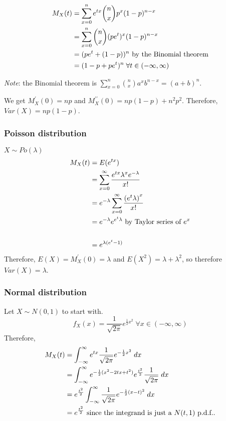\documentclass[12pt]{article}
\begin{document}
\begin{align*}
   M_X (t) &= \sum_{x=0}^{n} e^{tx} {n \choose x} p^x(1-p)^{n-x} \\	
   &= \sum_{x=0}^{n} {n \choose x} (pe^t)^x(1-p)^{n-x} \\
   &= (pe^t + (1 - p))^n \textnormal{ by the Binomial theorem} \\	
   &= (1 - p + pe^t)^n \; \forall t \in (-\infty, \infty)
\end{align*}
	
\emph{Note}: the Binomial theorem is $\sum_{x=0}^{n} {n \choose x} a^x b^{n-x} = (a+b)^n$.

We get $M_X^{\prime} (0) = np$ and $M_X^{\prime \prime} (0) = np(1-p) + n^2 p^2$. Therefore, $Var(X) = np(1-p)$.

\subsubsection{Poisson distribution}
$X \sim Po(\lambda)$
\begin{align*}
    M_X (t) &= E(e^{tx}) \\
        &= \sum_{x=0}^{\infty} \frac{e^{tx} \lambda^x e^{-\lambda}}{x!} \\
        &= e^{-\lambda} \sum_{x=0}^{\infty} \frac{ {(e^{t}\lambda)}^x}{x!} \\
        &= e^{-\lambda} e^{e^t \lambda} \textnormal{ by Taylor series of } e^x \\\\
        &= e^{\lambda (e^t - 1)}
\end{align*}
Therefore, $E(X) = M_X^{\prime} (0) = \lambda$ and $E(X^2) = \lambda + \lambda^2$, so therefore $Var(X) = \lambda$.

\subsubsection{Normal distribution}
Let $X \sim N(0,1)$ to start with. 
\[
    f_X (x) = \frac{1}{\sqrt{2 \pi}} e^{\frac{1}{2} x^2} \; \forall x \in (-\infty, \infty)
\]
Therefore,
\begin{align*}
    M_X (t) &= \int_{-\infty}^{\infty} e^{tx} \frac{1}{\sqrt{2 \pi}} e^{-\frac{1}{2} x^2} \; dx \\
        &= \int_{-\infty}^{\infty} e^{-\frac{1}{2} (x^2 - 2tx + t^2)} e^{\frac{t^2}{2}} \frac{1}{\sqrt{2\pi}} \; dx \\
        &= e^{\frac{t^2}{2}} \int_{-\infty}^{\infty} \frac{1}{\sqrt{2\pi}} e^{-\frac{1}{2} (x-t)^2} \; dx \\
        &= e^{\frac{t^2}{2}} \textnormal{ since the integrand is just a $N(t,1)$ p.d.f..}
\end{align*}
\end{document}
